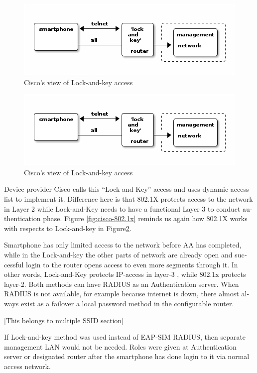 \documentclass[12pt,a4paper,english]{tutthesis}
\begin{document}
\begin{otherlanguage}{english}
\begin{figure}[htb]
\centering
\includegraphics[width=.9\linewidth]{lockandkey.png}
\caption{\label{fig:lock-and-view}Cisco's view of Lock-and-key access}
\end{figure}
\begin{figure}[htb]
\centering
\includegraphics[width=.9\linewidth]{lockandkey.png}
\caption{\label{fig:lock-and-view}Cisco's view of Lock-and-key access}
\end{figure}




Device provider Cisco calls this
 ``Lock-and-Key''\cite[p.117]{lockandkeybook}
access and uses dynamic access list to implement it.
Difference here is that 802.1X protects access to the network in Layer
2 while Lock-and-Key needs to have a functional Layer 3 to conduct
authentication phase.
Figure \ref{fig:cisco-802.1x} reminds us again how 802.1X works with respects to
Lock-and-key in Figure\ref{fig:lock-and-view}.

 Smartphone has only limited access to the network before AA
has completed, while in the Lock-and-key
the other parts of network are already open and successful login to the router opens
access to even more segments through it. In other words, Lock-and-Key
protects IP-access in layer-3 , while 802.1x protects layer-2.
Both methods can have RADIUS as an Authentication server. 
When RADIUS is not available, for example because internet is down,
there almost always exist as a failover a local password method in the configurable 
router.




[This belongs to multiple SSID section]

If Lock-and-key method was used instead of EAP-SIM RADIUS, then
separate manage\-ment LAN would not be needed. Roles were given at
Authentication server or designated router after the smartphone has done login to it
via normal access network.




\end{otherlanguage}
\end{document}
